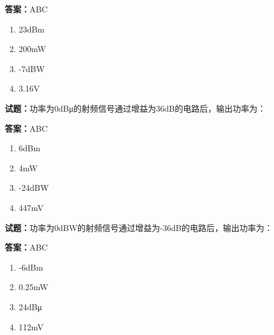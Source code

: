 \documentclass{ctexbook}
\begin{document}
\textbf{答案：}ABC 

\begin{enumerate}[leftmargin=3em]
  \item 23dBm 

  \item 200mW 

  \item -7dBW 

  \item 3.16V 

\end{enumerate}





\vspace{1em}

\textbf{试题：}功率为0dBμ的射频信号通过增益为36dB的电路后，输出功率为： 

\textbf{答案：}ABC 

\begin{enumerate}[leftmargin=3em]
  \item 6dBm 

  \item 4mW 

  \item -24dBW 

  \item 447mV 

\end{enumerate}





\vspace{1em}

\textbf{试题：}功率为0dBW的射频信号通过增益为-36dB的电路后，输出功率为： 

\textbf{答案：}ABC 


\begin{enumerate}[leftmargin=3em]
  \item -6dBm 

  \item 0.25mW 

  \item 24dBμ 

  \item 112mV 

\end{enumerate}

\end{document}
